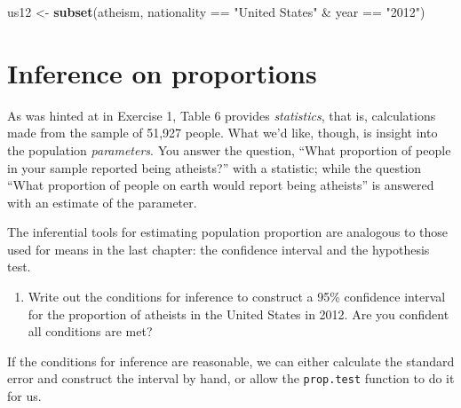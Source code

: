\documentclass[]{book}
\newenvironment{Shaded}{\begin{snugshade}}{\end{snugshade}}
\newcommand{\KeywordTok}[1]{\textcolor[rgb]{0.13,0.29,0.53}{\textbf{{#1}}}}
\newcommand{\DataTypeTok}[1]{\textcolor[rgb]{0.13,0.29,0.53}{{#1}}}
\newcommand{\StringTok}[1]{\textcolor[rgb]{0.31,0.60,0.02}{{#1}}}
\newcommand{\NormalTok}[1]{{#1}}
\providecommand{\tightlist}{%
  \setlength{\itemsep}{0pt}\setlength{\parskip}{0pt}}
\theoremstyle{definition}
\theoremstyle{definition}
\theoremstyle{remark}
\begin{document}
\begin{Shaded}
\begin{Highlighting}[]
\NormalTok{us12 <-}\StringTok{ }\KeywordTok{subset}\NormalTok{(atheism, nationality ==}\StringTok{ "United States"} \NormalTok{&}\StringTok{ }\NormalTok{year ==}\StringTok{ "2012"}\NormalTok{)}
\end{Highlighting}
\end{Shaded}

\section*{Inference on proportions}\label{inference-on-proportions}

As was hinted at in Exercise 1, Table 6 provides \emph{statistics}, that
is, calculations made from the sample of 51,927 people. What we'd like,
though, is insight into the population \emph{parameters}. You answer the
question, ``What proportion of people in your sample reported being
atheists?'' with a statistic; while the question ``What proportion of
people on earth would report being atheists'' is answered with an
estimate of the parameter.

The inferential tools for estimating population proportion are analogous
to those used for means in the last chapter: the confidence interval and
the hypothesis test.

\begin{enumerate}
\def\labelenumi{\arabic{enumi}.}
\setcounter{enumi}{4}
\tightlist
\item
  Write out the conditions for inference to construct a 95\% confidence
  interval for the proportion of atheists in the United States in 2012.
  Are you confident all conditions are met?
\end{enumerate}

If the conditions for inference are reasonable, we can either calculate
the standard error and construct the interval by hand, or allow the
\texttt{prop.test} function to do it for us.

\begin{Shaded}
\end{Shaded}
\end{document}
